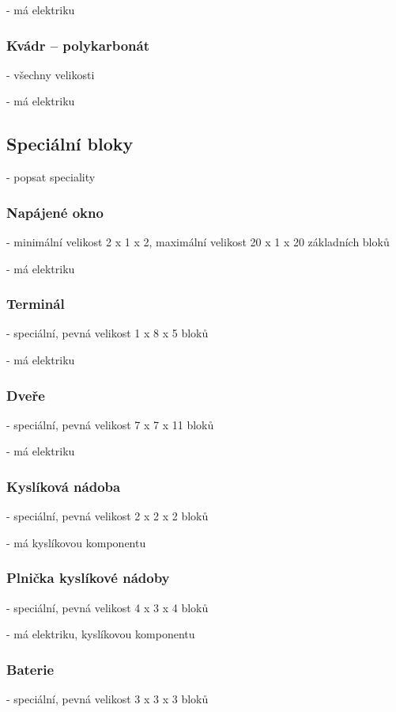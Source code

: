 - má elektriku

\subsubsection{Kvádr -- polykarbonát}
- všechny velikosti

- má elektriku


\subsection{Speciální bloky}
- popsat speciality

\subsubsection{Napájené okno}
- minimální velikost 2 x 1 x 2, maximální velikost 20 x 1 x 20 základních bloků

- má elektriku


\subsubsection{Terminál}
- speciální, pevná velikost 1 x 8 x 5 bloků

- má elektriku

\subsubsection{Dveře}
- speciální, pevná velikost 7 x 7 x 11 bloků

- má elektriku

\subsubsection{Kyslíková nádoba}
- speciální, pevná velikost 2 x 2 x 2 bloků

- má kyslíkovou komponentu

\subsubsection{Plnička kyslíkové nádoby}
- speciální, pevná velikost 4 x 3 x 4 bloků

- má elektriku, kyslíkovou komponentu


\subsubsection{Baterie}
- speciální, pevná velikost 3 x 3 x 3 bloků

